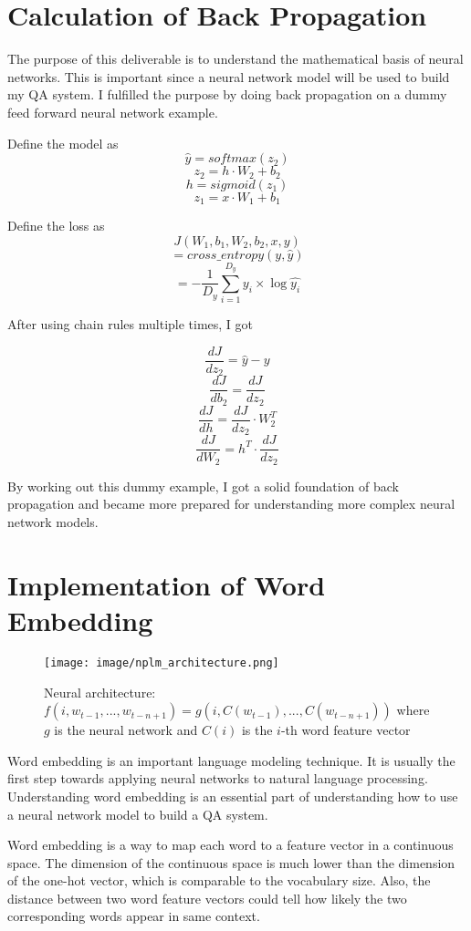 \documentclass[12pt]{article}
\begin{document}
\section{Calculation of Back Propagation}\label{sec:calculation}

The purpose of this deliverable is to understand the mathematical basis of neural networks. This is important since a neural network model will be used to build my QA system. I fulfilled the purpose by doing back propagation on a dummy feed forward neural network example.


Define the model as
$$\hat{y}=softmax(z_2)$$
$$z_2=h\cdot W_2 + b_2$$
$$h=sigmoid(z_1)$$
$$z_1=x\cdot W_1+b_1$$

Define the loss as
$$J(W_1, b_1, W_2, b_2, x, y)$$
$$=cross\_entropy(y, \hat{y})$$
$$=-\frac{1}{D_y}\sum_{i=1}^{D_y}y_i \times \log{\hat{y_i}} $$

After using chain rules multiple times, I got

$$\frac{dJ}{dz_2}=\hat{y} - y$$
$$\frac{dJ}{db_2}=\frac{dJ}{dz_2}$$
$$\frac{dJ}{dh}=\frac{dJ}{dz_2}\cdot W_2^T$$
$$\frac{dJ}{dW_2}=h^T \cdot \frac{dJ}{dz_2}$$

By working out this dummy example, I got a solid foundation of back propagation and became more prepared for understanding more complex neural network models.



\section{Implementation of Word Embedding}\label{sec:embdding}

\begin{figure}[h]
\texttt{[image: image/nplm\_architecture.png]}
\centering
\caption{Neural architecture: $f(i,w_{t-1},... ,w_{t-n+1}) =g(i,C(w_{t-1}),... ,C(w_{t-n+1}))$ where $g$ is the neural network and $C(i)$ is the $i$-th word feature vector\cite{bengio2003neural}}
\label{fig:nplm}
\end{figure}

Word embedding is an important language modeling technique. It is usually the first step towards applying neural networks to natural language processing. Understanding word embedding is an essential part of understanding how to use a neural network model to build a QA system.

Word embedding is a way to map each word to a feature vector in a continuous space. The dimension of the continuous space is much lower than the dimension of the one-hot vector, which is comparable to the vocabulary size. Also, the distance between two word feature vectors could tell how likely the two corresponding words appear in same context.
\end{document}
